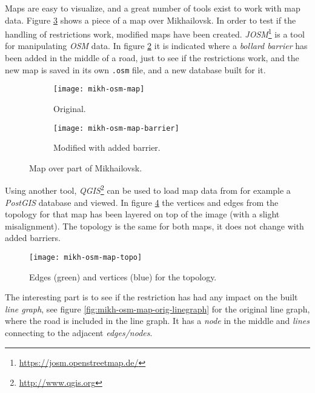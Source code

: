 \documentclass[../main.tex]{subfiles}
\begin{document}
Maps are easy to visualize, and a great number of tools exist to work with map data. Figure \ref{fig:mikh-osm-maps} shows a piece of a map over Mikhailovsk. In order to test if the handling of restrictions work, modified maps have been created. \textit{JOSM}\footnote{\url{https://josm.openstreetmap.de/}} is a tool for manipulating \textit{OSM} data. In figure \ref{fig:mikh-osm-map-barrier} it is indicated where a \textit{bollard barrier} has been added in the middle of a road, just to see if the restrictions work, and the new map is saved in its own \texttt{.osm} file, and a new database built for it. 

\begin{figure}[h]
    \centering
    \begin{subfigure}[t]{0.4\linewidth}
        \centering
        \texttt{[image: mikh-osm-map]}
        \caption{Original.}
        \label{fig:mikh-osm-map-orig}
    \end{subfigure}
    \hspace{5mm}
    \begin{subfigure}[t]{0.4\linewidth}
        \centering
        \texttt{[image: mikh-osm-map-barrier]}
        \caption{Modified with added barrier.}
        \label{fig:mikh-osm-map-barrier}
    \end{subfigure}
    \caption{Map over part of Mikhailovsk. \cite{img-mikh-osm-map}}
    \label{fig:mikh-osm-maps}
\end{figure}

Using another tool, \textit{QGIS}\footnote{\url{http://www.qgis.org}} can be used to load map data from for example a \textit{PostGIS} database and viewed. In figure \ref{fig:mikh-osm-map-topo} the vertices and edges from the topology for that map has been layered on top of the image (with a slight misalignment). The topology is the same for both maps, it does not change with added barriers.

\begin{figure}[h]
    \centering
    \texttt{[image: mikh-osm-map-topo]}
    \caption{Edges (green) and vertices (blue) for the topology.}
    \label{fig:mikh-osm-map-topo}
\end{figure}

The interesting part is to see if the restriction has had any impact on the built \textit{line graph}, see figure \ref{fig:mikh-osm-map-orig-linegraph} for the original line graph, where the road is included in the line graph. It has a \textit{node} in the middle and \textit{lines} connecting to the adjacent \textit{edges/nodes}.
\end{document}
